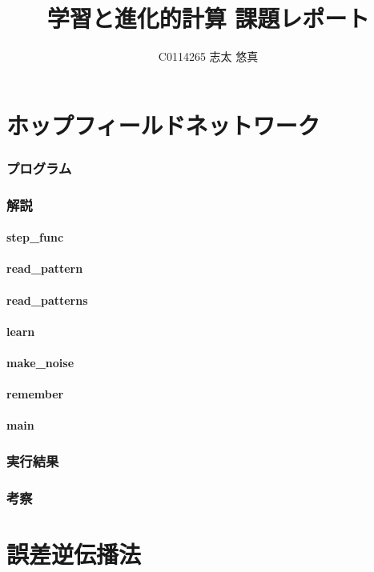 \documentclass{jsarticle}
\title{学習と進化的計算 課題レポート}
\author{C0114265 志太 悠真}
\begin{document}
\maketitle

\part{ホップフィールドネットワーク}
\section{プログラム}


\section{解説}
\subsection{step\_func}
\subsection{read\_pattern}
\subsection{read\_patterns}
\subsection{learn}
\subsection{make\_noise}
\subsection{remember}
\subsection{main}
\section{実行結果}
\section{考察}

\part{誤差逆伝播法}
\end{document}
